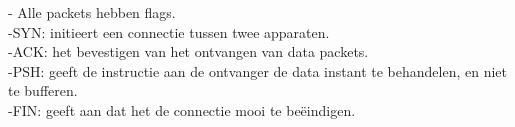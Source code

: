 - Alle packets hebben flags.\\

-SYN: initieert een connectie tussen twee apparaten.\\
-ACK: het bevestigen van het ontvangen van data packets.\\
-PSH: geeft de instructie aan de ontvanger de data instant te behandelen, en niet te bufferen. \\
-FIN: geeft aan dat het de connectie mooi te beëindigen.